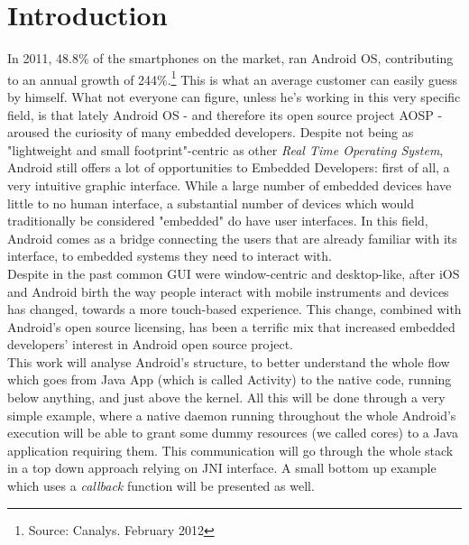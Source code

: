 
\section{Introduction}
In 2011, 48.8\% of the smartphones on the market, ran Android OS, contributing to an annual growth of 244\%.\footnote{Source: Canalys. February 2012} This is what an average customer can easily guess by himself. What not everyone can figure, unless he's working in this very specific field, is that lately Android OS - and therefore its open source project AOSP - aroused the curiosity of many embedded developers. Despite not being as "lightweight and small footprint"-centric as other \textit{Real Time Operating System}, Android still offers a lot of opportunities to Embedded Developers: first of all, a very intuitive graphic interface. While a large number of embedded devices have little to no human interface, a substantial number of devices which would traditionally be considered "embedded" do have user interfaces. In this field, Android comes as a bridge connecting the users that are already familiar with its interface, to embedded systems they need to interact with.\\
Despite in the past common GUI were window-centric and desktop-like, after iOS and Android birth the way people interact with mobile instruments and devices has changed, towards a more touch-based experience. This change, combined with Android's open source licensing, has been a terrific mix that increased embedded developers' interest in Android open source project.\\
This work will analyse Android's structure, to better understand the whole flow which goes from Java App (which is called Activity) to the native code, running below anything, and just above the kernel. All this will be done through a very simple example, where a native daemon running throughout the whole Android's execution will be able to grant some dummy resources (we called cores) to a Java application requiring them. This communication will go through the whole stack in a top down approach relying on JNI interface. A small bottom up example which uses a \textit{callback} function will be presented as well.